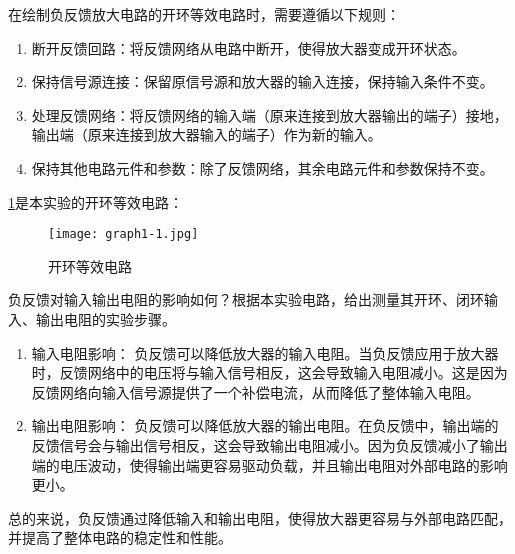 \documentclass[dvipsnames, svgnames,a4paper,11pt]{article}
\begin{document}
		在绘制负反馈放大电路的开环等效电路时，需要遵循以下规则：

		\begin{enumerate}
			\item 断开反馈回路：将反馈网络从电路中断开，使得放大器变成开环状态。
			\item 保持信号源连接：保留原信号源和放大器的输入连接，保持输入条件不变。
			\item 处理反馈网络：将反馈网络的输入端（原来连接到放大器输出的端子）接地，输出端（原来连接到放大器输入的端子）作为新的输入。
			\item 保持其他电路元件和参数：除了反馈网络，其余电路元件和参数保持不变。
		\end{enumerate}

		\cref{fig:fig1-1a}是本实验的开环等效电路：

		\begin{figure}[htbp]
			\centering
			\texttt{[image: graph1-1.jpg]}
			\caption{开环等效电路}
			\label{fig:fig1-1a}
		\end{figure}
		




	\begin{question}
		负反馈对输入输出电阻的影响如何？根据本实验电路，给出测量其开环、闭环输入、输出电阻的实验步骤。
	\end{question}
	
		\begin{enumerate}
			\item 	输入电阻影响： 负反馈可以降低放大器的输入电阻。当负反馈应用于放大器时，反馈网络中的电压将与输入信号相反，这会导致输入电阻减小。这是因为反馈网络向输入信号源提供了一个补偿电流，从而降低了整体输入电阻。
			\item 	输出电阻影响： 负反馈可以降低放大器的输出电阻。在负反馈中，输出端的反馈信号会与输出信号相反，这会导致输出电阻减小。因为负反馈减小了输出端的电压波动，使得输出端更容易驱动负载，并且输出电阻对外部电路的影响更小。

		\end{enumerate}

		总的来说，负反馈通过降低输入和输出电阻，使得放大器更容易与外部电路匹配，并提高了整体电路的稳定性和性能。\\
\end{document}
